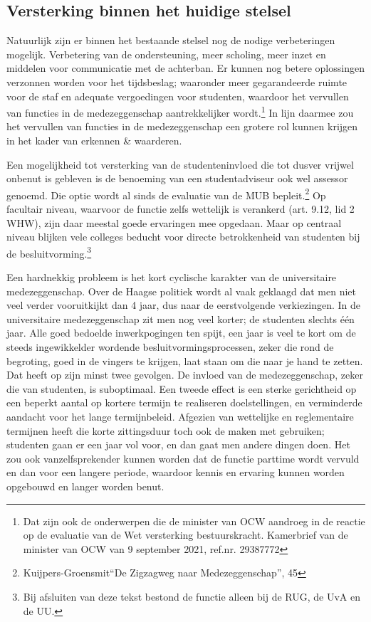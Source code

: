 \documentclass[empirical, authordate, ]{new-jote-article}
\begin{document}
	\subsection{Versterking binnen het huidige stelsel }



	Natuurlijk zijn er binnen het bestaande stelsel nog de nodige verbeteringen mogelijk. Verbetering van de ondersteuning, meer scholing, meer inzet en middelen voor communicatie met de achterban. Er kunnen nog betere oplossingen verzonnen worden voor het tijdsbeslag; waaronder meer gegarandeerde ruimte voor de staf en adequate vergoedingen voor studenten, waardoor het vervullen van functies in de medezeggenschap aantrekkelijker wordt.\footnote{Dat zijn ook de onderwerpen die de minister van OCW aandroeg in de reactie op de evaluatie van de Wet versterking bestuurskracht. Kamerbrief van de minister van OCW van 9 september 2021, ref.nr. 29387772} In lijn daarmee zou het vervullen van functies in de medezeggenschap een grotere rol kunnen krijgen in het kader van erkennen \& waarderen.



	Een mogelijkheid tot versterking van de studenteninvloed die tot dusver vrijwel onbenut is gebleven is de benoeming van een studentadviseur ook wel assessor genoemd. Die optie wordt al sinds de evaluatie van de MUB bepleit.\footnote{Kuijpers-Groensmit“De Zigzagweg naar Medezeggenschap”, 45} Op facultair niveau, waarvoor de functie zelfs wettelijk is verankerd (art. 9.12, lid 2 WHW), zijn daar meestal goede ervaringen mee opgedaan. Maar op centraal niveau blijken vele colleges beducht voor directe betrokkenheid van studenten bij de besluitvorming.\footnote{Bij afsluiten van deze tekst bestond de functie alleen bij de RUG, de UvA en de UU.}



	Een hardnekkig probleem is het kort cyclische karakter van de universitaire medezeggenschap. Over de Haagse politiek wordt al vaak geklaagd dat men niet veel verder vooruitkijkt dan 4 jaar, dus naar de eerstvolgende verkiezingen. In de universitaire medezeggenschap zit men nog veel korter; de studenten slechts één jaar. Alle goed bedoelde inwerkpogingen ten spijt, een jaar is veel te kort om de steeds ingewikkelder wordende besluitvormingsprocessen, zeker die rond de begroting, goed in de vingers te krijgen, laat staan om die naar je hand te zetten. Dat heeft op zijn minst twee gevolgen. De invloed van de medezeggenschap, zeker die van studenten, is suboptimaal. Een tweede effect is een sterke gerichtheid op een beperkt aantal op kortere termijn te realiseren doelstellingen, en verminderde aandacht voor het lange termijnbeleid. Afgezien van wettelijke en reglementaire termijnen heeft die korte zittingsduur toch ook de maken met gebruiken; studenten gaan er een jaar vol voor, en dan gaat men andere dingen doen. Het zou ook vanzelfsprekender kunnen worden dat de functie parttime wordt vervuld en dan voor een langere periode, waardoor kennis en ervaring kunnen worden opgebouwd en langer worden benut.
\end{document}
